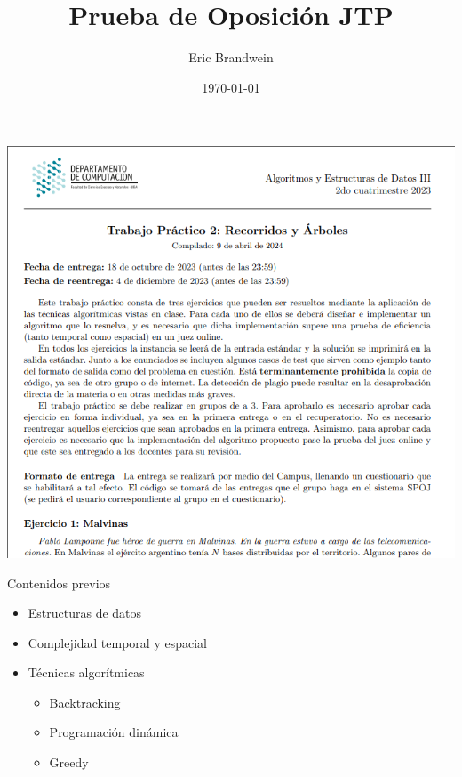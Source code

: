 \documentclass{beamer}
\title{Prueba de Oposición JTP}
\author{Eric Brandwein}
\date{\today}
\begin{document}
\begin{frame}
    \titlepage
\end{frame}

\begin{frame}{}
    \includegraphics[trim={1mm 0 0 1mm}, clip, width=\textwidth]{img/titulo-tp.png}
\end{frame}

\begin{frame}{Contenidos previos}
    \begin{itemize}
        \item Estructuras de datos
        \item Complejidad temporal y espacial
        \item<2-> Técnicas algorítmicas
        \begin{itemize}
            \item Backtracking
            \item Programación dinámica
            \item Greedy
        \end{itemize}
    \end{itemize}
\end{frame}
\end{document}
